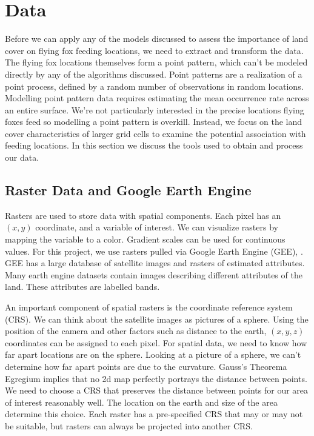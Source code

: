 \documentclass[
  12pt,
  letterpaper,
  DIV=11,
  numbers=noendperiod]{scrartcl}
\begin{document}
\section{Data}\label{sec:Data}

Before we can apply any of the models discussed to assess the importance
of land cover on flying fox feeding locations, we need to extract and
transform the data. The flying fox locations themselves form a point
pattern, which can't be modeled directly by any of the algorithms
discussed. Point patterns are a realization of a point process, defined
by a random number of observations in random locations. Modelling point
pattern data requires estimating the mean occurrence rate across an
entire surface. We're not particularly interested in the precise
locations flying foxes feed so modelling a point pattern is overkill.
Instead, we focus on the land cover characteristics of larger grid cells
to examine the potential association with feeding locations. In this
section we discuss the tools used to obtain and process our data.

\subsection{Raster Data and Google Earth
Engine}\label{raster-data-and-google-earth-engine}

Rasters are used to store data with spatial components. Each pixel has
an \((x,y)\) coordinate, and a variable of interest. We can visualize
rasters by mapping the variable to a color. Gradient scales can be used
for continuous values. For this project, we use rasters pulled via
Google Earth Engine (GEE), \citep{gee}. GEE has a large database of
satellite images and rasters of estimated attributes. Many earth engine
datasets contain images describing different attributes of the land.
These attributes are labelled bands.

An important component of spatial rasters is the coordinate reference
system (CRS). We can think about the satellite images as pictures of a
sphere. Using the position of the camera and other factors such as
distance to the earth, \((x,y,z)\) coordinates can be assigned to each
pixel. For spatial data, we need to know how far apart locations are on
the sphere. Looking at a picture of a sphere, we can't determine how far
apart points are due to the curvature. Gauss's Theorema Egregium implies
that no 2d map perfectly portrays the distance between points. We need
to choose a CRS that preserves the distance between points for our area
of interest reasonably well. The location on the earth and size of the
area determine this choice. Each raster has a pre-specified CRS that may
or may not be suitable, but rasters can always be projected into another
CRS.
\end{document}
